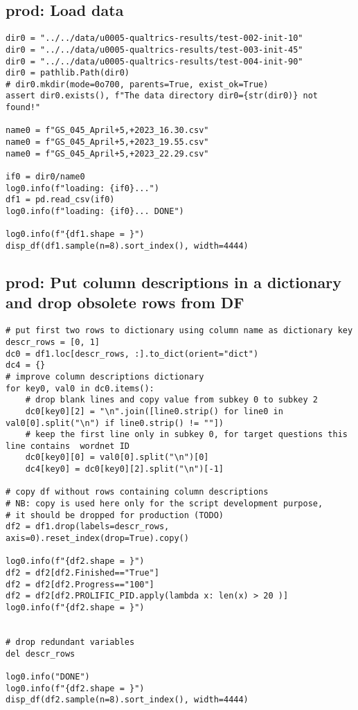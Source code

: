 \documentclass[a4paper,10pt,onecolumn,oneside,openright]{article}
\begin{document}
\subsection{prod: Load data}
\label{sec:orga92d24d}
\begin{verbatim}
dir0 = "../../data/u0005-qualtrics-results/test-002-init-10"
dir0 = "../../data/u0005-qualtrics-results/test-003-init-45"
dir0 = "../../data/u0005-qualtrics-results/test-004-init-90"
dir0 = pathlib.Path(dir0)
# dir0.mkdir(mode=0o700, parents=True, exist_ok=True)
assert dir0.exists(), f"The data directory dir0={str(dir0)} not found!"

name0 = f"GS_045_April+5,+2023_16.30.csv"
name0 = f"GS_045_April+5,+2023_19.55.csv"
name0 = f"GS_045_April+5,+2023_22.29.csv"

if0 = dir0/name0
log0.info(f"loading: {if0}...")
df1 = pd.read_csv(if0)
log0.info(f"loading: {if0}... DONE")

log0.info(f"{df1.shape = }")
disp_df(df1.sample(n=8).sort_index(), width=4444)
\end{verbatim}

\subsection{prod: Put column descriptions in a dictionary and drop obsolete rows from DF}
\label{sec:org24f7e5c}
\begin{verbatim}
# put first two rows to dictionary using column name as dictionary key
descr_rows = [0, 1]
dc0 = df1.loc[descr_rows, :].to_dict(orient="dict")
dc4 = {}
# improve column descriptions dictionary
for key0, val0 in dc0.items():
    # drop blank lines and copy value from subkey 0 to subkey 2
    dc0[key0][2] = "\n".join([line0.strip() for line0 in val0[0].split("\n") if line0.strip() != ""])
    # keep the first line only in subkey 0, for target questions this line contains  wordnet ID
    dc0[key0][0] = val0[0].split("\n")[0]
    dc4[key0] = dc0[key0][2].split("\n")[-1]

# copy df without rows containing column descriptions
# NB: copy is used here only for the script development purpose,
# it should be dropped for production (TODO)
df2 = df1.drop(labels=descr_rows, axis=0).reset_index(drop=True).copy()

log0.info(f"{df2.shape = }")
df2 = df2[df2.Finished=="True"]
df2 = df2[df2.Progress=="100"]
df2 = df2[df2.PROLIFIC_PID.apply(lambda x: len(x) > 20 )]
log0.info(f"{df2.shape = }")


# drop redundant variables
del descr_rows

log0.info("DONE")
log0.info(f"{df2.shape = }")
disp_df(df2.sample(n=8).sort_index(), width=4444)
\end{verbatim}
\end{document}
